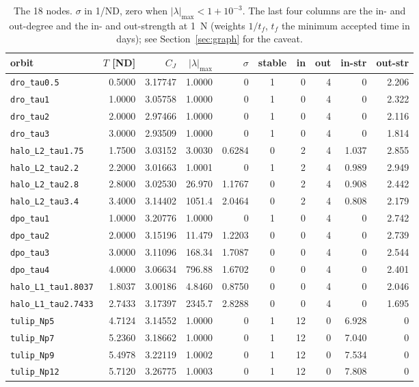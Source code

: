 \documentclass[11pt]{article}
\begin{document}
\begin{table}[tbp]
\centering\footnotesize
\begin{tabular}{@{}lrrrrcrrrr@{}}
\toprule
orbit & $T$ [ND] & $C_J$ & $|\lambda|_{\max}$ & $\sigma$ & stable & in & out & in-str & out-str \\
\midrule
\texttt{dro\_tau0.5}       & 0.5000 & 3.17747 & 1.0000 & 0      & 1 & 0  & 4 & 0     & 2.206 \\
\texttt{dro\_tau1}         & 1.0000 & 3.05758 & 1.0000 & 0      & 1 & 0  & 4 & 0     & 2.322 \\
\texttt{dro\_tau2}         & 2.0000 & 2.97466 & 1.0000 & 0      & 1 & 0  & 4 & 0     & 2.116 \\
\texttt{dro\_tau3}         & 3.0000 & 2.93509 & 1.0000 & 0      & 1 & 0  & 4 & 0     & 1.814 \\
\texttt{halo\_L2\_tau1.75} & 1.7500 & 3.03152 & 3.0030 & 0.6284 & 0 & 2  & 4 & 1.037 & 2.855 \\
\texttt{halo\_L2\_tau2.2}  & 2.2000 & 3.01663 & 1.0001 & 0      & 1 & 2  & 4 & 0.989 & 2.949 \\
\texttt{halo\_L2\_tau2.8}  & 2.8000 & 3.02530 & 26.970 & 1.1767 & 0 & 2  & 4 & 0.908 & 2.442 \\
\texttt{halo\_L2\_tau3.4}  & 3.4000 & 3.14402 & 1051.4 & 2.0464 & 0 & 2  & 4 & 0.808 & 2.179 \\
\texttt{dpo\_tau1}         & 1.0000 & 3.20776 & 1.0000 & 0      & 1 & 0  & 4 & 0     & 2.742 \\
\texttt{dpo\_tau2}         & 2.0000 & 3.15196 & 11.479 & 1.2203 & 0 & 0  & 4 & 0     & 2.739 \\
\texttt{dpo\_tau3}         & 3.0000 & 3.11096 & 168.34 & 1.7087 & 0 & 0  & 4 & 0     & 2.544 \\
\texttt{dpo\_tau4}         & 4.0000 & 3.06634 & 796.88 & 1.6702 & 0 & 0  & 4 & 0     & 2.401 \\
\texttt{halo\_L1\_tau1.8037} & 1.8037 & 3.00186 & 4.8460 & 0.8750 & 0 & 0 & 4 & 0   & 2.046 \\
\texttt{halo\_L1\_tau2.7433} & 2.7433 & 3.17397 & 2345.7 & 2.8288 & 0 & 0 & 4 & 0   & 1.695 \\
\texttt{tulip\_Np5}        & 4.7124 & 3.14552 & 1.0000 & 0      & 1 & 12 & 0 & 6.928 & 0 \\
\texttt{tulip\_Np7}        & 5.2360 & 3.18662 & 1.0000 & 0      & 1 & 12 & 0 & 7.040 & 0 \\
\texttt{tulip\_Np9}        & 5.4978 & 3.22119 & 1.0002 & 0      & 1 & 12 & 0 & 7.534 & 0 \\
\texttt{tulip\_Np12}       & 5.7120 & 3.26775 & 1.0003 & 0      & 1 & 12 & 0 & 7.808 & 0 \\
\bottomrule
\end{tabular}
\caption{The 18 nodes. $\sigma$ in 1/ND, zero when $|\lambda|_{\max} < 1 + 10^{-3}$. The last four
columns are the in- and out-degree and the in- and out-strength at 1~N (weights $1/t_f$, $t_f$ the
minimum accepted time in days); see Section~\ref{sec:graph} for the caveat.}
\label{tab:nodes}
\end{table}
\end{document}
